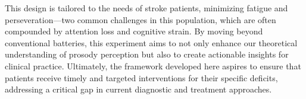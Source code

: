 This design is tailored to the needs of stroke patients, minimizing fatigue and perseveration—two common challenges in this population, which are often compounded by attention loss and cognitive strain. By moving beyond conventional batteries, this experiment aims to not only enhance our theoretical understanding of prosody perception but also to create actionable insights for clinical practice. Ultimately, the framework developed here aspires to ensure that patients receive timely and targeted interventions for their specific deficits, addressing a critical gap in current diagnostic and treatment approaches.
